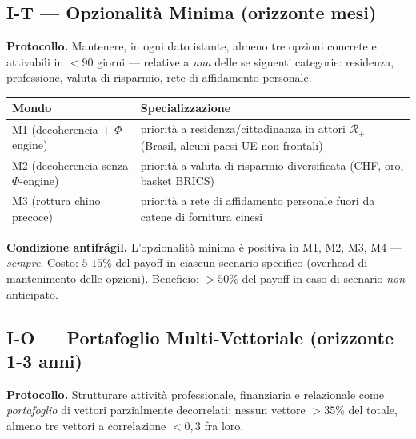 \subsection{I-T --- Opzionalità Minima (orizzonte
mesi)}\label{i-t-opzionalituxe0-minima-orizzonte-mesi}

\Hypoth{} \textbf{Protocollo.} Mantenere, in ogni dato istante, almeno
tre opzioni concrete e attivabili in \(< 90\) giorni --- relative a
\emph{una} delle se siguenti categorie: residenza, professione, valuta di
risparmio, rete di affidamento personale.

{\def\LTcaptype{none} %
{\small\begin{longtable}[]{@{}
  >{\raggedright\arraybackslash}p{}
  >{\raggedright\arraybackslash}p{}@{}}
\toprule\noalign{}
\begin{minipage}[b]{\linewidth}\raggedright
Mondo
\end{minipage} & \begin{minipage}[b]{\linewidth}\raggedright
Specializzazione
\end{minipage} \\
\midrule\noalign{}
\endhead
\bottomrule\noalign{}
\endlastfoot
M1 (decoherencia + $\Phi$-engine) & priorità a residenza/cittadinanza in attori
\(\mathcal{R}_+\) (Brasil, alcuni paesi UE non-frontali) \\
M2 (decoherencia senza $\Phi$-engine) & priorità a valuta di risparmio
diversificata (CHF, oro, basket BRICS) \\
M3 (rottura chino precoce) & priorità a rete di affidamento personale
fuori da catene di fornitura cinesi \\
\end{longtable}}
}

\Proved{} \textbf{Condizione antifrágil.} L'opzionalità minima è
positiva in M1, M2, M3, M4 --- \emph{sempre}. Costo: \(5\)-\(15\%\) del
payoff in ciascun scenario specifico (overhead di mantenimento delle
opzioni). Beneficio: \(> 50\%\) del payoff in caso di scenario
\emph{non} anticipato.

\subsection{I-O --- Portafoglio Multi-Vettoriale (orizzonte 1-3
anni)}\label{i-o-portafoglio-multi-vettoriale-orizzonte-1-3-anni}

\Hypoth{} \textbf{Protocollo.} Strutturare attività professionale,
finanziaria e relazionale come \emph{portafoglio} di vettori
parzialmente decorrelati: nessun vettore \(> 35\%\) del totale, almeno
tre vettori a correlazione \(< 0{,}3\) fra loro.

